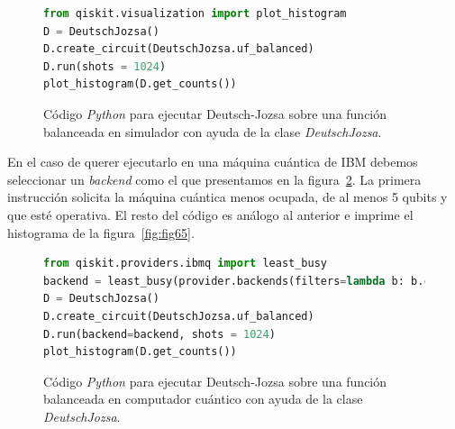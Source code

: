 \begin{figure}[t]
\begin{lstlisting}[language=Python]
from qiskit.visualization import plot_histogram
D = DeutschJozsa()
D.create_circuit(DeutschJozsa.uf_balanced)
D.run(shots = 1024)
plot_histogram(D.get_counts())
\end{lstlisting}
\caption{Código \textit{Python} para ejecutar Deutsch-Jozsa sobre una función balanceada en simulador con ayuda de la clase \textit{DeutschJozsa}.}
\label{code:code62}
\end{figure}

En el caso de querer ejecutarlo en una máquina cuántica de IBM debemos seleccionar un \textit{backend}  como el que presentamos en la figura~\ref{code:code63}. La primera instrucción solicita la máquina cuántica menos ocupada, de al menos 5 qubits y que esté operativa. El resto del código es análogo al anterior e imprime el histograma de la figura~\ref{fig:fig65}.

\begin{figure}[tb!]
\begin{lstlisting}[language=Python]
from qiskit.providers.ibmq import least_busy
backend = least_busy(provider.backends(filters=lambda b: b.configuration().n_qubits >= 5 and not b.configuration().simulator and b.status().operational==True))
D = DeutschJozsa()
D.create_circuit(DeutschJozsa.uf_balanced)
D.run(backend=backend, shots = 1024)
plot_histogram(D.get_counts())
\end{lstlisting}
\caption{Código \textit{Python} para ejecutar Deutsch-Jozsa sobre una función balanceada en computador cuántico con ayuda de la clase \textit{DeutschJozsa}.}
\label{code:code63}
\end{figure}

